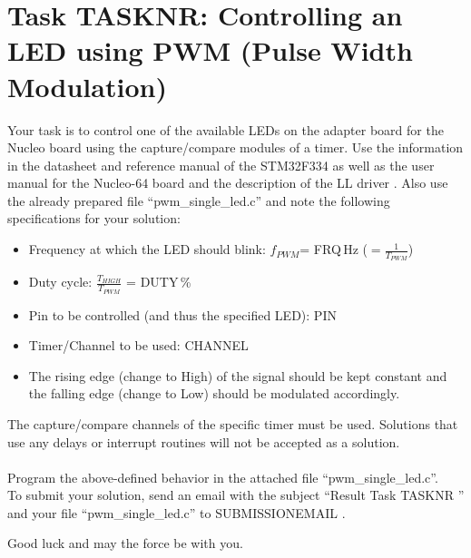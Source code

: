 \documentclass[a4paper,12pt]{article}
\begin{document}
\pagestyle{empty}
\setlength{\parindent}{0em}
\section*{Task {{TASKNR}}: Controlling an LED using PWM (Pulse Width Modulation)}

Your task is to control one of the available LEDs on the adapter board for the Nucleo board using the capture/compare modules of a timer. Use the information in the datasheet \cite{data_sheet} and reference manual \cite{ref_manual} of the STM32F334 as well as the user manual for the Nucleo-64 board \cite{nucleo_manual} and the description of the LL driver \cite{driver_manual}. Also use the already prepared file \enquote{pwm\_single\_led.c} and note the following specifications for your solution:

\begin{itemize}
\item Frequency at which the LED should blink: $f_{PWM}$= {{FRQ}}\,Hz ($=\frac{1}{T_{PWM}}$)
\item Duty cycle: $\frac{T_{HIGH}}{T_{PWM}}$ = {{DUTY}}\,\%
\item Pin to be controlled (and thus the specified LED): {{PIN}}
\item Timer/Channel to be used: {{CHANNEL}}
\item The rising edge (change to High) of the signal should be kept constant and the falling edge (change to Low) should be modulated accordingly.
\end{itemize}
\vspace{0.3cm}

The capture/compare channels of the specific timer must be used. Solutions that use any delays or interrupt routines will not be accepted as a solution.
\\

\\

Program the above-defined behavior in the attached file \enquote{pwm\_single\_led.c}.
\\

To submit your solution, send an email with the subject \enquote{Result Task {{ TASKNR }}} and your file \enquote{pwm\_single\_led.c} to {{ SUBMISSIONEMAIL }}.

\vspace{0.7cm}

Good luck and may the force be with you.

\newpage
\printbibliography[heading=bibintoc]
\end{document}
